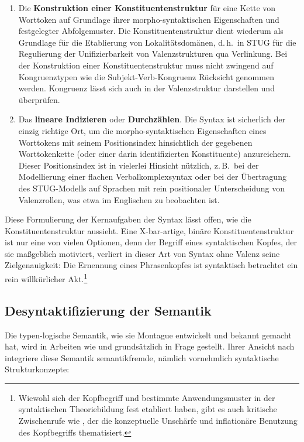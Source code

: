 {\begin{enumerate}
  \item Die {\bf Konstruktion einer Konstituentenstruktur} für eine Kette von Worttoken auf Grundlage ihrer morpho-syntaktischen Eigenschaften und festgelegter Abfolgemuster. Die Konstituentenstruktur dient wiederum als Grundlage für die Etablierung von Lokalitätsdomänen, d.\,h.\ in STUG für die Regulierung der Unifizierbarkeit von Valenzstrukturen qua Verlinkung. Bei der Konstruktion einer Konstituentenstruktur muss nicht zwingend auf  Kongruenztypen wie die Subjekt-Verb-Kongruenz Rücksicht genommen werden. Kongruenz lässt sich auch in der Valenzstruktur darstellen und überprüfen.   
  \item Das {\bf lineare Indizieren} oder {\bf Durchzählen}. Die Syntax ist sicherlich der einzig richtige Ort, um die morpho-syntaktischen Eigenschaften eines Worttokens mit seinem Positionsindex hinsichtlich der gegebenen Worttokenkette (oder einer darin identifizierten Konstituente) anzureichern. Dieser Positionsindex ist in vielerlei Hinsicht nützlich, z.\,B.\ bei der Modellierung einer flachen Verbalkomplexsyntax oder bei der Übertragung des STUG-Modells auf Sprachen mit rein positionaler Unterscheidung von Valenzrollen, was etwa im Englischen zu beobachten ist.  
\end{enumerate}  
Diese Formulierung der Kernaufgaben der Syntax lässt offen, wie die Konstituentenstruktur aussieht. Eine X-bar-artige, binäre Konstituentenstruktur ist nur eine von vielen Optionen, denn der Begriff eines syntaktischen Kopfes, der sie ma\ss geblich motiviert, verliert in dieser Art von Syntax ohne Valenz seine Zielgenauigkeit: Die Ernennung eines Phrasenkopfes ist syntaktisch betrachtet ein rein willkürlicher Akt.\footnote{Wiewohl sich der Kopfbegriff und bestimmte Anwendungsmuster in der syntaktischen Theoriebildung fest etabliert haben, gibt es auch kritische Zwischenrufe wie \cite{Matthews:07}, der die konzeptuelle Unschärfe und inflationäre Benutzung des Kopfbegriffs thematisiert.}
   

  



\subsection{Desyntaktifizierung der Semantik}

Die typen-logische Semantik, wie sie Montague entwickelt und bekannt gemacht hat, wird in Arbeiten wie \cite{Kracht:07,Kracht:11} und \cite{Erdelyi-Szabo:etal:08} grundsätzlich in Frage gestellt. Ihrer Ansicht nach integriere diese Semantik semantikfremde, nämlich vornehmlich syntaktische Strukturkonzepte:

}
